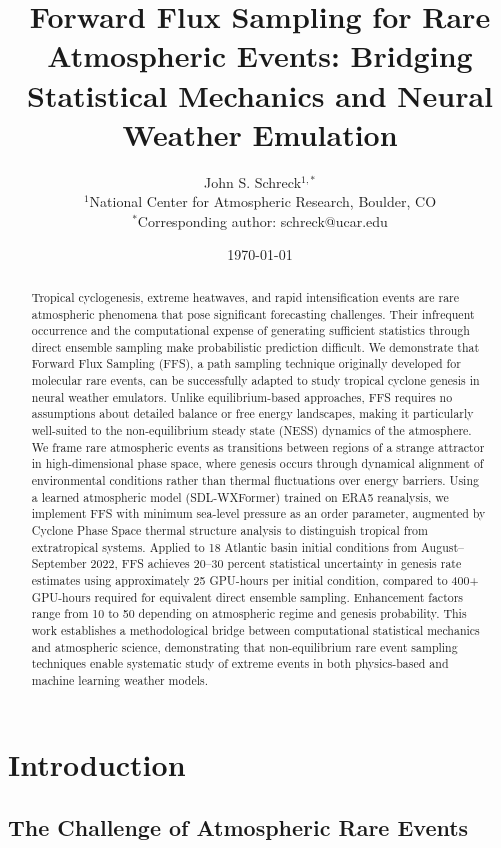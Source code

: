 \documentclass[11pt]{article}
\title{Forward Flux Sampling for Rare Atmospheric Events: Bridging Statistical Mechanics and Neural Weather Emulation}
\author{%
  John S. Schreck$^{1,*}$ \\
  \small $^1$National Center for Atmospheric Research, Boulder, CO \\
  \small $^*$Corresponding author: schreck@ucar.edu
}
\date{\today}
\begin{document}
\maketitle

\begin{abstract}
Tropical cyclogenesis, extreme heatwaves, and rapid intensification events are rare atmospheric phenomena that pose significant forecasting challenges. Their infrequent occurrence and the computational expense of generating sufficient statistics through direct ensemble sampling make probabilistic prediction difficult. We demonstrate that Forward Flux Sampling (FFS), a path sampling technique originally developed for molecular rare events, can be successfully adapted to study tropical cyclone genesis in neural weather emulators. Unlike equilibrium-based approaches, FFS requires no assumptions about detailed balance or free energy landscapes, making it particularly well-suited to the non-equilibrium steady state (NESS) dynamics of the atmosphere. We frame rare atmospheric events as transitions between regions of a strange attractor in high-dimensional phase space, where genesis occurs through dynamical alignment of environmental conditions rather than thermal fluctuations over energy barriers. Using a learned atmospheric model (SDL-WXFormer) trained on ERA5 reanalysis, we implement FFS with minimum sea-level pressure as an order parameter, augmented by Cyclone Phase Space thermal structure analysis to distinguish tropical from extratropical systems. Applied to 18 Atlantic basin initial conditions from August--September 2022, FFS achieves 20--30 percent statistical uncertainty in genesis rate estimates using approximately 25 GPU-hours per initial condition, compared to 400+ GPU-hours required for equivalent direct ensemble sampling. Enhancement factors range from 10 to 50 depending on atmospheric regime and genesis probability. This work establishes a methodological bridge between computational statistical mechanics and atmospheric science, demonstrating that non-equilibrium rare event sampling techniques enable systematic study of extreme events in both physics-based and machine learning weather models.
\end{abstract}

\section{Introduction}

\subsection{The Challenge of Atmospheric Rare Events}
\end{document}
